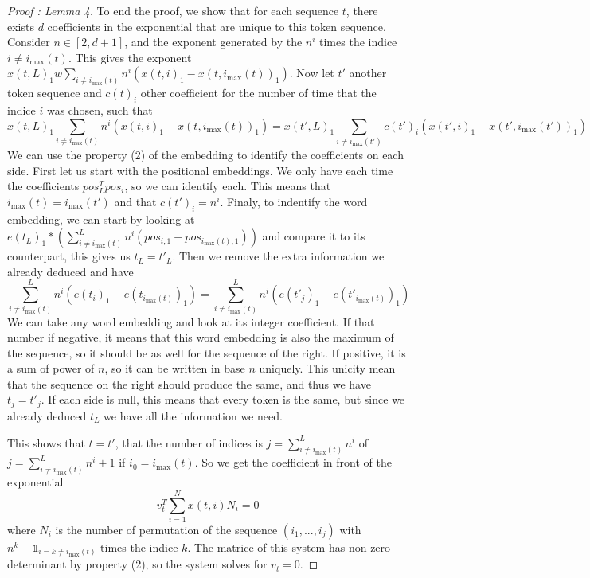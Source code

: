 \documentclass{article}
\begin{document}
\begin{proof}[Proof : Lemma 4]
    To end the proof, we show that for each sequence $t$, there exists $d$ coefficients in the exponential that are unique to this 
    token sequence. Consider $n\in [2, d+1]$, and the exponent generated by the $n^i$ times the indice $i\neq i_{\max}(t)$. This
    gives the exponent $x(t,L)_1w\sum_{i\neq i_{\max}(t)}n^i(x(t,i)_1 - x(t,i_{\max}(t))_1)$. Now let $t'$ another token sequence and 
    $c(t)_i$ other coefficient for the number of time that the indice $i$ was chosen, such that
    \[x(t,L)_1\sum_{i\neq i_{\max}(t)}n^i(x(t,i)_1 - x(t,i_{\max}(t))_1) = x(t',L)_1\sum_{i\neq i_{\max}(t')}c(t')_i(x(t',i)_1 - x(t',i_{\max}(t'))_1)\]
    We can use the property (2) of the embedding to identify the coefficients on each side.
    First let us start with the positional embeddings. We only have each time the coefficients $pos_L^Tpos_i$, so we can identify each. 
    This means that $i_{\max}(t) = i_{\max}(t')$ and that $c(t')_i = n^i$.
    Finaly, to indentify the word embedding, we can start by looking at 
    $e(t_L)_1*\left(\sum_{i\neq i_{\max}(t)}^Ln^i(pos_{i, 1} - pos_{i_{\max}(t), 1})\right)$
    and compare it to its counterpart, this gives us $t_L = t'_L$.
    Then we remove the extra information we already deduced and have
    \[\sum_{i\neq i_{\max}(t)}^Ln^i(e(t_i)_1 - e(t_{i_{\max}(t)})_1) = \sum_{i\neq i_{\max}(t)}^Ln^i(e(t'_j)_1 - e(t'_{i_{\max}(t)})_1)\]
    We can take any word embedding and look at its integer coefficient.
    If that number if negative, it means that this word embedding is also the maximum of the sequence, so it should be as well for
    the sequence of the right. 
    If positive, it is a sum of power of $n$, so it can be written in base $n$ uniquely. This unicity mean 
    that the sequence on the right should produce the same, and thus we have $t_j = t'_j$. 
    If each side is null, this means that every token is the same, but since we already deduced 
    $t_L$ we have all the information we need.
    \bigbreak

    This shows that $t = t'$, that the number of indices is $j = \sum_{i\neq i_{\max}(t)}^Ln^i$ of $j = \sum_{i\neq i_{\max}(t)}^Ln^i+1$
    if $i_0 = i_{\max}(t)$. So we get the coefficient in front of the exponential
    \[v_t^T\sum_{i=1}^{N}x(t,i)N_i = 0\] where $N_i$ is the number of permutation of the sequence $(i_1, ..., i_j)$ with 
    $n^k - \mathbb{1}_{i=k\neq i_{\max}(t)}$ times the indice $k$.
    The matrice of this system has non-zero determinant by property (2), so the system solves for $v_t = 0$.
\end{proof}
\end{document}
